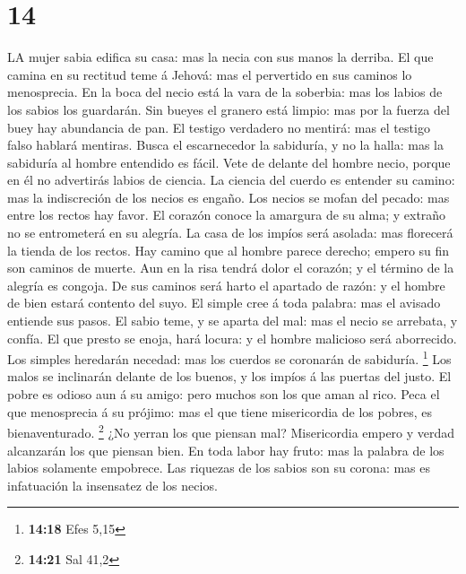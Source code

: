 \hypertarget{section-13}{%
\section{14}\label{section-13}}

 LA mujer sabia edifica su casa: mas la necia con sus manos
la derriba.  El que camina en su rectitud teme á Jehová: mas
el pervertido en sus caminos lo menosprecia.  En la boca del
necio está la vara de la soberbia: mas los labios de los sabios los
guardarán.  Sin bueyes el granero está limpio: mas por la
fuerza del buey hay abundancia de pan.  El testigo verdadero
no mentirá: mas el testigo falso hablará mentiras.  Busca el
escarnecedor la sabiduría, y no la halla: mas la sabiduría al hombre
entendido es fácil.  Vete de delante del hombre necio,
porque en él no advertirás labios de ciencia.  La ciencia
del cuerdo es entender su camino: mas la indiscreción de los necios es
engaño.  Los necios se mofan del pecado: mas entre los
rectos hay favor.  El corazón conoce la amargura de su
alma; y extraño no se entrometerá en su alegría.  La casa
de los impíos será asolada: mas florecerá la tienda de los rectos.
 Hay camino que al hombre parece derecho; empero su fin son
caminos de muerte.  Aun en la risa tendrá dolor el corazón;
y el término de la alegría es congoja.  De sus caminos será
harto el apartado de razón: y el hombre de bien estará contento del
suyo.  El simple cree á toda palabra: mas el avisado
entiende sus pasos.  El sabio teme, y se aparta del mal:
mas el necio se arrebata, y confía.  El que presto se
enoja, hará locura: y el hombre malicioso será aborrecido. 
Los simples heredarán necedad: mas los cuerdos se coronarán de
sabiduría. \footnote{\textbf{14:18} Efes 5,15}  Los malos
se inclinarán delante de los buenos, y los impíos á las puertas del
justo.  El pobre es odioso aun á su amigo: pero muchos son
los que aman al rico.  Peca el que menosprecia á su
prójimo: mas el que tiene misericordia de los pobres, es bienaventurado.
\footnote{\textbf{14:21} Sal 41,2}  ¿No yerran los que
piensan mal? Misericordia empero y verdad alcanzarán los que piensan
bien.  En toda labor hay fruto: mas la palabra de los
labios solamente empobrece.  Las riquezas de los sabios son
su corona: mas es infatuación la insensatez de los necios. 
